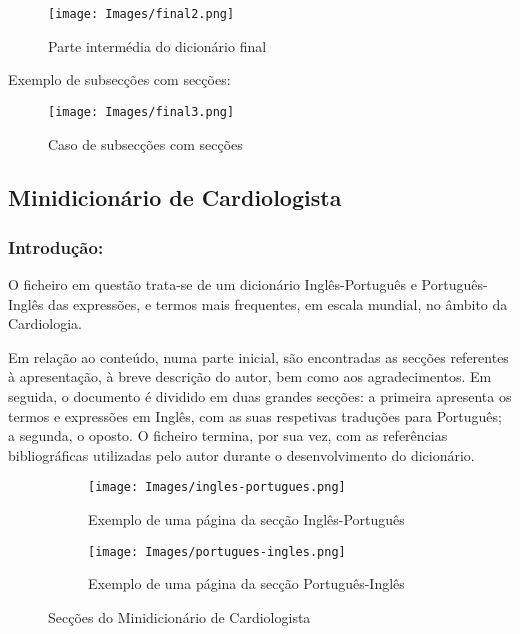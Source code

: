 \begin{figure}[H]
    \centering
    \centering
    \texttt{[image: Images/final2.png]}
    \caption{Parte intermédia do dicionário final}
    \label{fig:final2}
\end{figure}

Exemplo de subsecções com secções:
\begin{figure}[H]
    \centering
    \centering
    \texttt{[image: Images/final3.png]}
    \caption{Caso de subsecções com secções}
    \label{fig:final3}
\end{figure}

\subsection{Minidicionário de Cardiologista}

\subsubsection{Introdução:}

O ficheiro em questão trata-se de um dicionário Inglês-Português e Português-Inglês das expressões, e termos mais frequentes, em escala mundial, no âmbito da Cardiologia. 

Em relação ao conteúdo, numa parte inicial, são encontradas as secções referentes à apresentação, à breve descrição do autor, bem como aos agradecimentos. Em seguida, o documento é dividido em duas grandes secções: a primeira apresenta os termos e expressões em Inglês, com as suas respetivas traduções para Português; a segunda, o oposto. O ficheiro termina, por sua vez, com as referências bibliográficas utilizadas pelo autor durante o desenvolvimento do dicionário.

\begin{figure}[H]
    \centering
    \begin{subfigure}{0.4\textwidth}
      \centering
      \texttt{[image: Images/ingles-portugues.png]}
      \caption{Exemplo de uma página da secção Inglês-Português}
      \label{fig:ingles-portugues}
    \end{subfigure}
    \hfill
    \begin{subfigure}{0.4\textwidth}
      \centering
      \texttt{[image: Images/portugues-ingles.png]}
      \caption{Exemplo de uma página da secção Português-Inglês}
      \label{fig:portugues-ingles}
    \end{subfigure}
    \caption{Secções do Minidicionário de Cardiologista}
    \label{fig:seccoes}
\end{figure}

